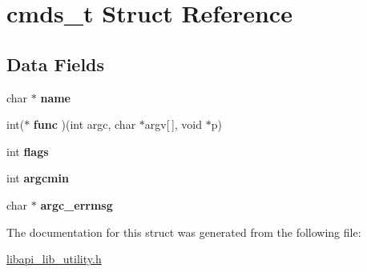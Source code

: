 \hypertarget{structcmds__t}{}\section{cmds\+\_\+t Struct Reference}
\label{structcmds__t}
\subsection*{Data Fields}
\begin{DoxyCompactItemize}
\item 
\mbox{\label{structcmds__t_a404e3fcff7ead2355bf62436c69ac249}} 
char $\ast$ {\bfseries name}
\item 
\mbox{\label{structcmds__t_abbfe5cb9f5bd1d5fd68a95de4fd5e322}} 
int($\ast$ {\bfseries func} )(int argc, char $\ast$argv\mbox{[}$\,$\mbox{]}, void $\ast$p)
\item 
\mbox{\label{structcmds__t_aafbc91d142e58daeeda36b6ae989e8d7}} 
int {\bfseries flags}
\item 
\mbox{\label{structcmds__t_a769b71c09f6053dcf6f634ee609f8027}} 
int {\bfseries argcmin}
\item 
\mbox{\label{structcmds__t_a769b8703b2da6b866de3f3bd835cbc21}} 
char $\ast$ {\bfseries argc\+\_\+errmsg}
\end{DoxyCompactItemize}


The documentation for this struct was generated from the following file\+:\begin{DoxyCompactItemize}
\item 
\hyperlink{libapi__lib__utility_8h}{libapi\+\_\+lib\+\_\+utility.\+h}\end{DoxyCompactItemize}
